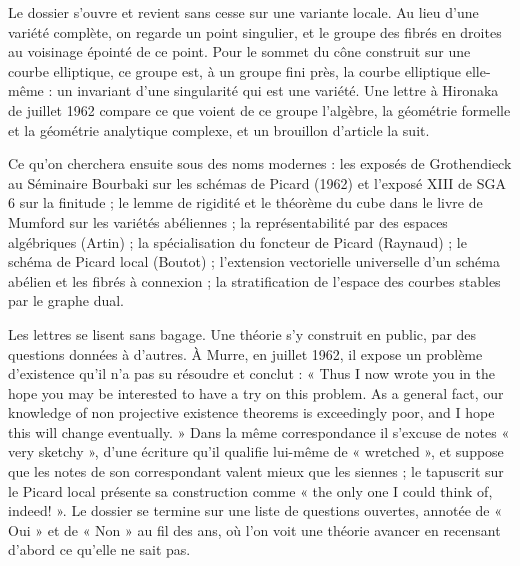 \documentclass[11pt,a4paper]{article}
\begin{document}
\begin{resume}
Le dossier s'ouvre et revient sans cesse sur une variante locale. Au lieu d'une
variété complète, on regarde un point singulier, et le groupe des fibrés en
droites au voisinage épointé de ce point. Pour le sommet du cône construit sur
une courbe elliptique, ce groupe est, à un groupe fini près, la courbe
elliptique elle-même : un invariant d'une singularité qui est une variété. Une
lettre à Hironaka de juillet 1962 compare ce que voient de ce groupe l'algèbre,
la géométrie formelle et la géométrie analytique complexe, et un brouillon
d'article la suit.

Ce qu'on cherchera ensuite sous des noms modernes : les exposés de Grothendieck
au Séminaire Bourbaki sur les schémas de Picard (1962) et l'exposé XIII de
SGA 6 sur la finitude ; le lemme de rigidité et le théorème du cube dans le
livre de Mumford sur les variétés abéliennes ; la représentabilité par des
espaces algébriques (Artin) ; la spécialisation du foncteur de Picard
(Raynaud) ; le schéma de Picard local (Boutot) ; l'extension vectorielle
universelle d'un schéma abélien et les fibrés à connexion ; la stratification
de l'espace des courbes stables par le graphe dual.

Les lettres se lisent sans bagage. Une théorie
s'y construit en public, par des questions données à d'autres. À Murre, en
juillet 1962, il expose un problème d'existence qu'il n'a pas su résoudre et
conclut : « Thus I now wrote you in the hope you may be interested to have a
try on this problem. As a general fact, our knowledge of non projective
existence theorems is exceedingly poor, and I hope this will change
eventually. » Dans la même correspondance il s'excuse de notes « very
sketchy », d'une écriture qu'il qualifie lui-même de « wretched », et suppose
que les notes de son correspondant valent mieux que les siennes ; le tapuscrit
sur le Picard local présente sa construction comme « the only one I could think
of, indeed! ». Le dossier se termine sur une liste de questions ouvertes,
annotée de « Oui » et de « Non » au fil des ans, où l'on voit une théorie
avancer en recensant d'abord ce qu'elle ne sait pas.


\end{resume}
\end{document}
